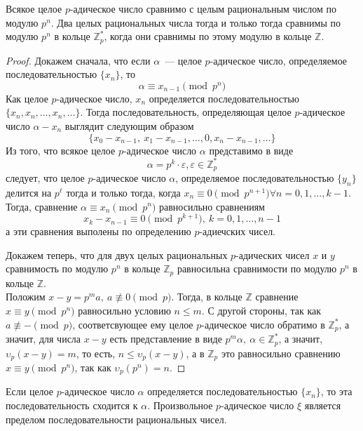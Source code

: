 \documentclass[11pt]{article}
\begin{document}
    \begin{theorem}
        Всякое целое $p$-адическое число сравнимо с целым рациональным числом по модулю $p^n$. Два целых рациональных числа тогда и только тогда сравнимы по модулю
        $p^n$ в кольце $\mathbb{Z}_p^{*}$, когда они сравнимы по этому модулю в кольце $\mathbb{Z}$.
    \end{theorem}
    \begin{proof}
        Докажем сначала, что если $\alpha$~--- целое $p$-адическое число, определяемое последовательностью $\{ x_n \}$, то
        \[ \alpha \equiv x_{n - 1} \pmod{p^n} \]
        Как целое $p$-адическое число, $x_n$  определяется последовательностью $\{ x_n, x_n, \ldots, x_n, \ldots \}$. Тогда последовательность, определяющая целое $p$-адическое число
        $\alpha - x_n$ выглядит следующим образом
        \[ \{ x_0 - x_{n - 1}, \ x_1 - x_{n - 1}, \ldots, 0, x_n - x_{n - 1}, \ldots \}\]
        Из того, что всякое целое $p$-адическое число $\alpha$ представимо в виде
        \[ \alpha = p^k \cdot \varepsilon, \varepsilon \in \mathbb{Z}_p^{*}\]
        следует, что целое $p$-адическое число $\alpha$, определяемое последовательностью $\{ y_n \}$ делится на $p^{\ell}$ тогда и только тогда, когда
        $x_n \equiv 0 \pmod{p^{n + 1}} \forall n = 0, 1, \ldots, k - 1$.
        Тогда, сравнение  $\alpha \equiv x_n \pmod{p^n}$ равносильно сравнениям
        \[ x_k - x_{n - 1} \equiv 0 \pmod{p^{k + 1}}, \ k = 0, 1, \ldots, n - 1\]
        а эти сравнения выполены по определению $p$-адиечских чисел.

        Докажем теперь, что для двух целых рациональных $p$-адических чисел $x$ и $y$ сравнимость по модулю $p^n$ в кольце $\mathbb{Z}_p$ равносильна
        сравнимости по модулю $p^n$ в кольце $\mathbb{Z}$.\\
        Положим $x - y = p^m a, \ a \not\equiv 0 \pmod{p} $. Тогда, в кольце $\mathbb{Z}$ сравнение $x \equiv y \pmod{p^n}$ равносильно условию $n \le m$.
        С другой стороны, так как $a \not\equiv - \pmod{p}$, соответсвующее ему целое $p$-адическое число обратимо в $\mathbb{Z}_p^{*}$, а значит, для числа
        $x - y$ есть представление в виде $p^m \alpha, \ \alpha \in \mathbb{Z}_p^{*}$, а значит, $ \upsilon_p{(x - y)} = m$, то есть, $n \le \upsilon_p{(x - y)}$,
        а в $\mathbb{Z}_p$ это равносильно сравнению $x \equiv y \pmod{p^n}$, так как $ \upsilon_p{(p^n)} = n$.
    \end{proof}
    \begin{theorem}
        Если целое $p$-адическое число $\alpha$ определяется последовательностью $\{ x_n \}$, то эта последовательность сходится к $\alpha$. Произвольное $p$-адическое число
        $\xi$ является пределом последовательности рациональных чисел.
    \end{theorem}
\end{document}
